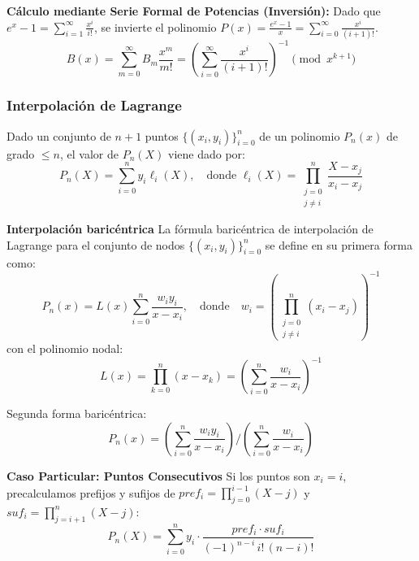
\textbf{Cálculo mediante Serie Formal de Potencias (Inversión):}
Dado que $e^x - 1 = \sum_{i=1}^\infty \frac{x^i}{i!}$, se invierte el polinomio $P(x) = \frac{e^x - 1}{x} = \sum_{i=0}^\infty \frac{x^i}{(i+1)!}$.
\[
B(x) = \sum_{m=0}^\infty B_m \frac{x^m}{m!} = \left( \sum_{i=0}^\infty \frac{x^i}{(i+1)!} \right)^{-1} \pmod{x^{k+1}}
\]


\subsubsection{Interpolación de Lagrange}

Dado un conjunto de $n+1$ puntos $\{(x_i, y_i)\}_{i=0}^{n}$ de un polinomio $P_n(x)$ de grado $\le n$, el valor de $P_n(X)$ viene dado por:
\[
P_n(X) = \sum_{i=0}^{n} y_i \ell_i(X), \quad \text{donde } \ell_i(X) = \prod_{\substack{j=0 \\ j \neq i}}^{n} \frac{X - x_j}{x_i - x_j}
\]



\textbf{Interpolación baricéntrica}
La fórmula baricéntrica de interpolación de Lagrange para el conjunto de nodos $\{(x_i, y_i)\}_{i=0}^{n}$ se define en su primera forma como:
\begin{equation*}
P_n(x) = L(x) \sum_{i=0}^{n} \frac{w_i y_i}{x - x_i}, 
\quad \text{donde} \quad 
w_i = \left( \prod_{\substack{j=0 \\ j \neq i}}^{n} (x_i - x_j) \right)^{-1}
\end{equation*}
con el polinomio nodal:
\begin{equation*}
L(x) = \prod_{k=0}^{n} (x - x_k) = \left( \sum_{i=0}^{n} \frac{w_i}{x - x_i} \right)^{-1}
\end{equation*}

Segunda forma baricéntrica:
\begin{equation*}
    P_n(x) = \left( \sum_{i=0}^{n} \frac{w_i y_i}{x - x_i} \right) \Big/ \left( \sum_{i=0}^{n} \frac{w_i}{x - x_i} \right)
\end{equation*}



\textbf{Caso Particular: Puntos Consecutivos}
Si los puntos son $x_i = i$, precalculamos prefijos y sufijos de $pref_i = \prod_{j=0}^{i-1} (X - j)$ y $suf_i = \prod_{j=i+1}^{n} (X - j)$:
\[
P_n(X) = \sum_{i=0}^{n} y_i \cdot \frac{pref_i \cdot suf_i}{ (-1)^{n-i}\, i! \, (n-i)!}
\]

